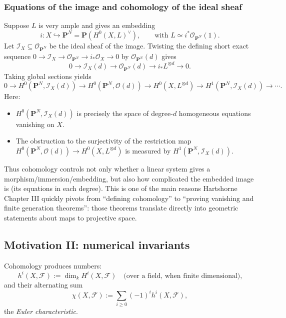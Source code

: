 \documentclass[11pt]{article}
\theoremstyle{definition}
\theoremstyle{plain}
\newcommand{\PP}{\mathbf{P}}
\begin{document}
\subsubsection{Equations of the image and cohomology of the ideal sheaf}

Suppose $L$ is very ample and gives an embedding
\[
i:X\hookrightarrow \PP^{N}=\PP(H^0(X,L)^\vee),
\qquad \text{with } L\simeq i^*\mathcal{O}_{\PP^N}(1).
\]
Let $\mathcal{I}_X\subseteq \mathcal{O}_{\PP^N}$ be the ideal sheaf of the image.
Twisting the defining short exact sequence $0\to \mathcal{I}_X\to \mathcal{O}_{\PP^N}\to i_*\mathcal{O}_X\to 0$ by $\mathcal{O}_{\PP^N}(d)$ gives
\begin{equation}\label{eq:ideal-twist}
0\to \mathcal{I}_X(d)\to \mathcal{O}_{\PP^N}(d)\to i_*L^{\otimes d}\to 0.
\end{equation}
Taking global sections yields
\begin{equation}\label{eq:ideal-global}
0\to H^0(\PP^N,\mathcal{I}_X(d)) \to H^0(\PP^N,\mathcal{O}(d)) \to H^0(X,L^{\otimes d})
\to H^1(\PP^N,\mathcal{I}_X(d))\to \cdots.
\end{equation}
Here:
\begin{itemize}
\item $H^0(\PP^N,\mathcal{I}_X(d))$ is precisely the space of degree-$d$ homogeneous equations vanishing on $X$.
\item The obstruction to the surjectivity of the restriction map
$H^0(\PP^N,\mathcal{O}(d))\to H^0(X,L^{\otimes d})$
is measured by $H^1(\PP^N,\mathcal{I}_X(d))$.
\end{itemize}
Thus cohomology controls not only whether a linear system gives a morphism/immersion/embedding, but also how complicated the embedded image is (its equations in each degree). This is one of the main reasons Hartshorne Chapter III quickly pivots from ``defining cohomology'' to ``proving vanishing and finite generation theorems'': those theorems translate directly into geometric statements about maps to projective space.

\subsection{Motivation II: numerical invariants}

Cohomology produces numbers:
\[
h^i(X,\mathcal{F}) := \dim_k H^i(X,\mathcal{F})
\quad\text{(over a field, when finite dimensional),}
\]
and their alternating sum
\[
\chi(X,\mathcal{F}) := \sum_{i\ge 0} (-1)^i h^i(X,\mathcal{F}),
\]
the \emph{Euler characteristic}.
\end{document}
